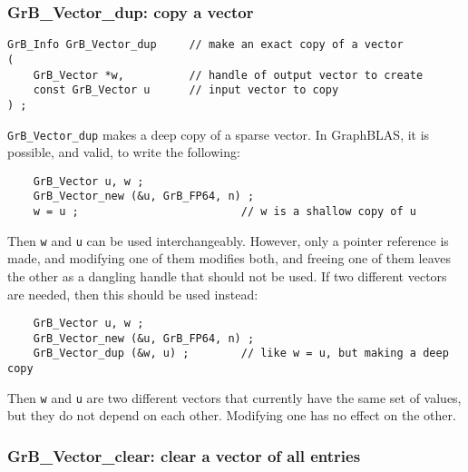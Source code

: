 \documentclass[12pt]{article}
\begin{document}
\newpage
\subsubsection{{\sf GrB\_Vector\_dup:}           copy a vector}
\label{vector_dup}

\begin{mdframed}[userdefinedwidth=6in]
{\footnotesize
\begin{verbatim}
GrB_Info GrB_Vector_dup     // make an exact copy of a vector
(
    GrB_Vector *w,          // handle of output vector to create
    const GrB_Vector u      // input vector to copy
) ;
\end{verbatim}
} \end{mdframed}

\verb'GrB_Vector_dup' makes a deep copy of a sparse vector.
In GraphBLAS, it is possible, and valid, to write the following:

    {\footnotesize
    \begin{verbatim}
    GrB_Vector u, w ;
    GrB_Vector_new (&u, GrB_FP64, n) ;
    w = u ;                         // w is a shallow copy of u  \end{verbatim}}

Then \verb'w' and \verb'u' can be used interchangeably.  However, only a pointer
reference is made, and modifying one of them modifies both, and freeing one of
them leaves the other as a dangling handle that should not be used.
If two different vectors are needed, then this should be used instead:

    {\footnotesize
    \begin{verbatim}
    GrB_Vector u, w ;
    GrB_Vector_new (&u, GrB_FP64, n) ;
    GrB_Vector_dup (&w, u) ;        // like w = u, but making a deep copy \end{verbatim}}

Then \verb'w' and \verb'u' are two different vectors that currently have the
same set of values, but they do not depend on each other.  Modifying one has
no effect on the other.

\subsubsection{{\sf GrB\_Vector\_clear:}         clear a vector of all entries}
\label{vector_clear}
\end{document}
